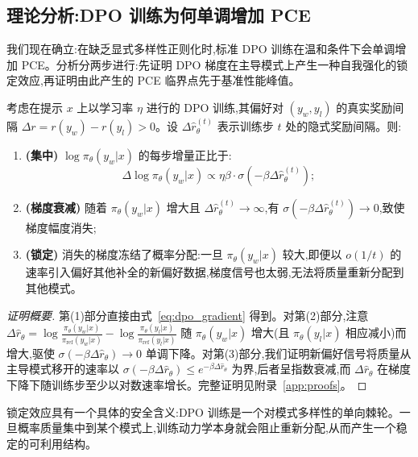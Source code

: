 \subsection{理论分析:DPO 训练为何单调增加 PCE}
\label{sec:theory}

我们现在确立:在缺乏显式多样性正则化时,标准 DPO 训练在温和条件下会单调增加 PCE。分析分两步进行:先证明 DPO 梯度在主导模式上产生一种自我强化的锁定效应,再证明由此产生的 PCE 临界点先于基准性能峰值。

\begin{proposition}[梯度锁定]
\label{prop:gradient_lockin}
考虑在提示 $x$ 上以学习率 $\eta$ 进行的 DPO 训练,其偏好对 $(y_w, y_l)$ 的真实奖励间隔 $\Delta r = r(y_w) - r(y_l) > 0$。设 $\Delta\hat{r}_\theta^{(t)}$ 表示训练步 $t$ 处的隐式奖励间隔。则:
\begin{enumerate}[leftmargin=*,itemsep=2pt]
    \item \textbf{(集中)} $\log \pi_\theta(y_w|x)$ 的每步增量正比于:
    \begin{equation}
    \label{eq:concentration}
    \Delta \log \pi_\theta(y_w|x) \propto \eta \beta \cdot \sigma(-\beta \Delta\hat{r}_\theta^{(t)});
    \end{equation}
    \item \textbf{(梯度衰减)} 随着 $\pi_\theta(y_w|x)$ 增大且 $\Delta\hat{r}_\theta^{(t)} \to \infty$,有 $\sigma(-\beta \Delta\hat{r}_\theta^{(t)}) \to 0$,致使梯度幅度消失;
    \item \textbf{(锁定)} 消失的梯度冻结了概率分配:一旦 $\pi_\theta(y_w|x)$ 较大,即便以 $o(1/t)$ 的速率引入偏好其他补全的新偏好数据,梯度信号也太弱,无法将质量重新分配到其他模式。
\end{enumerate}
\end{proposition}
\begin{proof}[证明概要]
第(1)部分直接由式~\eqref{eq:dpo_gradient} 得到。对第(2)部分,注意 $\Delta\hat{r}_\theta = \log\frac{\pi_\theta(y_w|x)}{\pi_{\text{ref}}(y_w|x)} - \log\frac{\pi_\theta(y_l|x)}{\pi_{\text{ref}}(y_l|x)}$ 随 $\pi_\theta(y_w|x)$ 增大(且 $\pi_\theta(y_l|x)$ 相应减小)而增大,驱使 $\sigma(-\beta\Delta\hat{r}_\theta) \to 0$ 单调下降。对第(3)部分,我们证明新偏好信号将质量从主导模式移开的速率以 $\sigma(-\beta\Delta\hat{r}_\theta) \leq e^{-\beta\Delta\hat{r}_\theta}$ 为界,后者呈指数衰减,而 $\Delta\hat{r}_\theta$ 在梯度下降下随训练步至少以对数速率增长。完整证明见附录~\ref{app:proofs}。
\end{proof}

锁定效应具有一个具体的安全含义:DPO 训练是一个对模式多样性的单向棘轮。一旦概率质量集中到某个模式上,训练动力学本身就会阻止重新分配,从而产生一个稳定的可利用结构。

